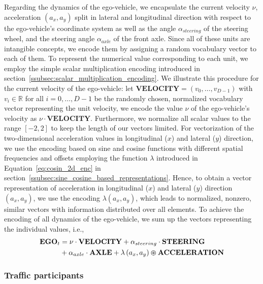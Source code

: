 Regarding the dynamics of the ego-vehicle, we encapsulate the current velocity $\nu$, acceleration $(a_x, a_y)$ split in lateral and longitudinal direction with respect to the ego-vehicle's coordinate system  as well as the angle $\alpha_{steering}$ of the steering wheel, and the steering angle $\alpha_{axle}$ of the front axle.
Since all of these units are intangible concepts, we encode them by assigning a random vocabulary vector to each of them.
To represent the numerical value corresponding to each unit, we employ the simple scalar multiplication encoding introduced in section~\ref{ssubsec:scalar_multiplication_encoding}.
We illustrate this procedure for the current velocity of the ego-vehicle: let $ \mathbf{VELOCITY} = \left(v_0, \ldots, v_{D-1}\right)$ with $v_i \in \mathbb{R}$ for all $i=0, \ldots, D-1$ be the randomly chosen, normalized vocabulary vector representing the unit velocity, we encode the value $\nu$ of the ego-vehicle's velocity as $\nu \cdot \mathbf{VELOCITY}$.
Furthermore, we normalize all scalar values to the range $\left[-2,2\right]$ to keep the length of our vectors limited.
For vectorization of the two-dimensional acceleration values in longitudinal ($x$) and lateral ($y$) direction, we use the encoding based on sine and cosine functions with different spatial frequencies and offsets employing the function $\lambda$ introduced in Equation~\eqref{eq:cosin_2d_enc} in section~\ref{ssubsec:sine_cosine_based_representations}.
Hence, to obtain a vector representation of acceleration in longitudinal ($x$) and lateral ($y$) direction $(a_x, a_y)$, we use the encoding $\lambda\left(a_x, a_y\right)$, which leads to normalized, nonzero, similar vectors with information distributed over all elements.
To achieve the encoding of all dynamics of the ego-vehicle, we sum up the vectors representing the individual values, i.e.,
\begin{align}
\label{eq:ego_dynamics}
\mathbf{EGO}_{t} &= \nu \cdot \mathbf{VELOCITY} + \alpha_{steering} \cdot\mathbf{STEERING} \nonumber \\
             &+ \alpha_{axle} \cdot\mathbf{AXLE} + \lambda\left(a_x, a_y\right) \varoast \mathbf{ACCELERATION}
\end{align}
\subsubsection{Traffic participants}%
\label{ssubsec:traffic_participants_context_class}

